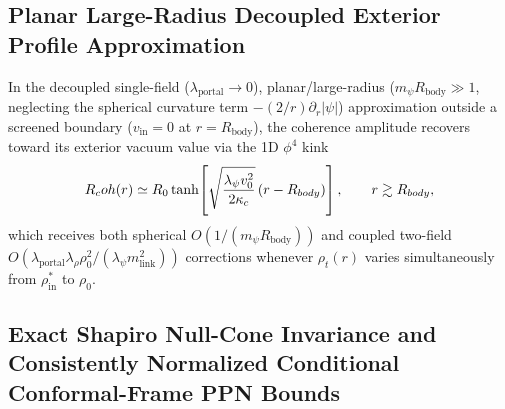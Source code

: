 \subsection{Planar Large-Radius Decoupled Exterior Profile Approximation}

In the decoupled single-field ($\lambda_{\mathrm{portal}} \to 0$), planar/large-radius ($m_\psi R_{\mathrm{body}} \gg 1$, neglecting the spherical curvature term $-(2/r)\partial_r|\psi|$) approximation outside a screened boundary ($v_{\mathrm{in}} = 0$ at $r = R_{\mathrm{body}}$), the coherence amplitude recovers toward its exterior vacuum value via the 1D $\phi^4$ kink
\begin{equation}
R_coh(r) \simeq R_0 \tanh\!\left[\sqrt{\frac{\lambda_\psi v_0^2}{2\kappa_c}}\,(r - R_{body})\right],
\qquad r \gtrsim R_{body},
\label{eq:radial_tanh_profile}
\end{equation}
which receives both spherical $O(1/(m_\psi R_{\mathrm{body}}))$ and coupled two-field $O(\lambda_{\mathrm{portal}}\lambda_\rho\rho_0^2 / (\lambda_\psi m_{\mathrm{link}}^2))$ corrections whenever $\rho_t(r)$ varies simultaneously from $\rho_{\mathrm{in}}^*$ to $\rho_0$.

\subsection{Exact Shapiro Null-Cone Invariance and Consistently Normalized Conditional Conformal-Frame PPN Bounds}
\label{sec:ppn-shapiro-exact}


